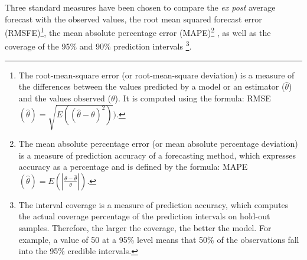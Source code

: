 \documentclass{article}\usepackage[]{graphicx}\usepackage[]{color}
\begin{document}
Three standard measures have been chosen to compare the \textit{ex post} average forecast with the observed values, the root mean squared forecast error (RMSFE)\footnote{
The root-mean-square error (or root-mean-square deviation) is a measure of the differences between the values predicted by a model or an estimator ($\hat{\theta}$) and the values observed ($\theta$). It is computed using the formula: RMSE$(\hat{\theta})=\sqrt{E((\hat{\theta} - \theta)^2)})$.},
 the mean absolute percentage error (MAPE)\footnote{
The mean absolute percentage error (or mean absolute percentage deviation) is a measure of prediction accuracy of a forecasting method, which expresses accuracy as a percentage and is defined by the formula: MAPE$(\hat{\theta}) = E\left( \left|\frac{\theta - \hat{\theta}}{\theta}\right| \right)$.}
\cite{hyndman2006another}, as well as the coverage of the 95\% and 90\% prediction intervals \cite{azose2015bayesian}\footnote{The interval coverage is a measure of prediction accuracy, which computes the actual coverage percentage of the prediction intervals on hold-out samples. Therefore, the larger the coverage, the better the model. For example, a value of 50 at a 95\% level means that 50\% of the observations fall into the 95\% credible intervals.}.
\end{document}

